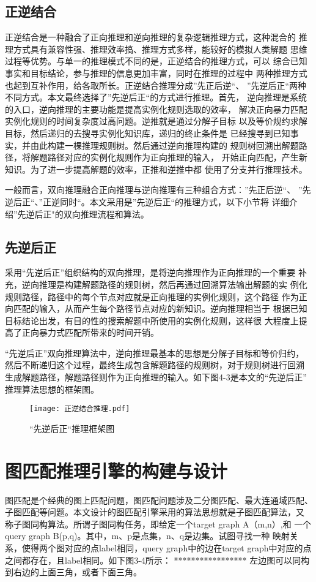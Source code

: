 \documentclass{standalone}
\begin{document}
\subsection{正逆结合}
正逆结合是一种融合了正向推理和逆向推理的复杂逻辑推理方式，这种混合的
推理方式具有兼容性强、推理效率搞、推理方式多样，能较好的模拟人类解题
思维过程等优势。与单一的推理模式不同的是，正逆结合的推理方式，可以
综合已知事实和目标结论，参与推理的信息更加丰富，同时在推理的过程中
两种推理方式也起到互补作用，给各取所长。正逆结合推理分成”先正后逆“、
”先逆后正“两种不同方式。本文最终选择了”先逆后正“的方式进行推理。首先，
逆向推理是系统的入口，逆向推理的主要功能是提高实例化规则选取的效率，
解决正向暴力匹配实例化规则的时间复杂度过高问题。逆推就是通过分解子目标
以及等价规约求解目标，然后递归的去搜寻实例化知识库，递归的终止条件是
已经搜寻到已知事实，并由此构建一棵推理规则树。然后通过逆向推理构建的
规则树回溯出解题路径，将解题路径对应的实例化规则作为正向推理的输入，
开始正向匹配，产生新知识。为了进一步提高解题的效率，正推和逆推中都
使用了分支并行推理技术。

一般而言，双向推理融合正向推理与逆向推理有三种组合方式：”先正后逆“、
”先逆后正“、”正逆同时“。本文采用是”先逆后正“的推理方式，以下小节将
详细介绍”先逆后正"的双向推理流程和算法。

\subsection{先逆后正}
采用“先逆后正”组织结构的双向推理，是将逆向推理作为正向推理的一个重要
补充，逆向推理是构建解题路径的规则树，然后再通过回溯算法输出解题的实
例化规则路径，路径中的每个节点对应就是正向推理的实例化规则，这个路径
作为正向匹配的输入，从而产生每个路径节点对应的新知识。逆向推理相当于
根据已知目标结论出发，有目的性的搜索解题中所使用的实例化规则，这样很
大程度上提高了正向暴力式匹配所带来的时间开销。

“先逆后正”双向推理算法中，逆向推理最基本的思想是分解子目标和等价归约，
然后不断递归这个过程，最终生成包含解题路径的规则树，对于规则树进行回溯
生成解题路径，解题路径则作为正向推理的输入。如下图4-3是本文的“先逆后正”
推理算法思想的框架图。

\begin{figure}[htbp]
	\texttt{[image: 正逆结合推理.pdf]}
	\caption{“先逆后正“推理框架图}
	\label{正逆结合推理}
\end{figure}

\section{图匹配推理引擎的构建与设计}
图匹配是个经典的图上匹配问题，图匹配问题涉及二分图匹配、最大连通域匹配、
子图匹配等问题。本文设计的图匹配引擎采用的算法思想就是子图匹配算法，又
称子图同构算法。所谓子图同构任务，即给定一个target graph A（m,n）,和
一个query graph B(p,q)。其中，m、p是点集，n、q是边集。试图寻找一种
映射关系，使得两个图对应的点label相同，query graph中的边在target 
graph中对应的点之间都存在，且label相同。如下图3-4所示：
*****************
左边图可以同构到右边的上面三角，或者下面三角。
\end{document}
